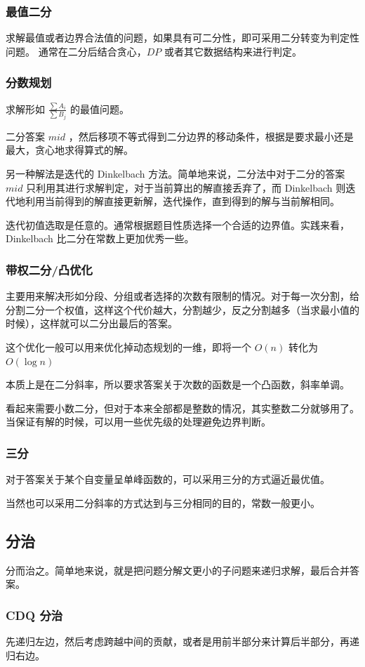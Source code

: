 \documentclass[UTF-8]{ctexart}
\begin{document}
			\subsubsection{最值二分}
			求解最值或者边界合法值的问题，如果具有可二分性，即可采用二分转变为判定性问题。
			通常在二分后结合贪心，$DP$ 或者其它数据结构来进行判定。
			\subsubsection{分数规划}
			求解形如 $\frac{\sum A_i}{\sum B_j}$ 的最值问题。
	
			二分答案 $mid$ ，然后移项不等式得到二分边界的移动条件，根据是要求最小还是最大，贪心地求得算式的解。
	
			另一种解法是迭代的 Dinkelbach 方法。简单地来说，二分法中对于二分的答案 $mid$ 只利用其进行求解判定，对于当前算出的解直接丢弃了，而 Dinkelbach 则迭代地利用当前得到的解直接更新解，迭代操作，直到得到的解与当前解相同。
	
			迭代初值选取是任意的。通常根据题目性质选择一个合适的边界值。实践来看，Dinkelbach 比二分在常数上更加优秀一些。
			\subsubsection{带权二分/凸优化}
			主要用来解决形如分段、分组或者选择的次数有限制的情况。对于每一次分割，给分割二分一个权值，这样这个代价越大，分割越少，反之分割越多（当求最小值的时候），这样就可以二分出最后的答案。
	
			这个优化一般可以用来优化掉动态规划的一维，即将一个 $O(n)$ 转化为 $O(\log n)$
	
			本质上是在二分斜率，所以要求答案关于次数的函数是一个凸函数，斜率单调。
	
			看起来需要小数二分，但对于本来全部都是整数的情况，其实整数二分就够用了。当保证有解的时候，可以用一些优先级的处理避免边界判断。
			\subsubsection{三分}
			对于答案关于某个自变量呈单峰函数的，可以采用三分的方式逼近最优值。
	
			当然也可以采用二分斜率的方式达到与三分相同的目的，常数一般更小。
		\subsection{分治}
		分而治之。简单地来说，就是把问题分解文更小的子问题来递归求解，最后合并答案。
			\subsubsection{CDQ 分治}
			先递归左边，然后考虑跨越中间的贡献，或者是用前半部分来计算后半部分，再递归右边。
	
\end{document}
